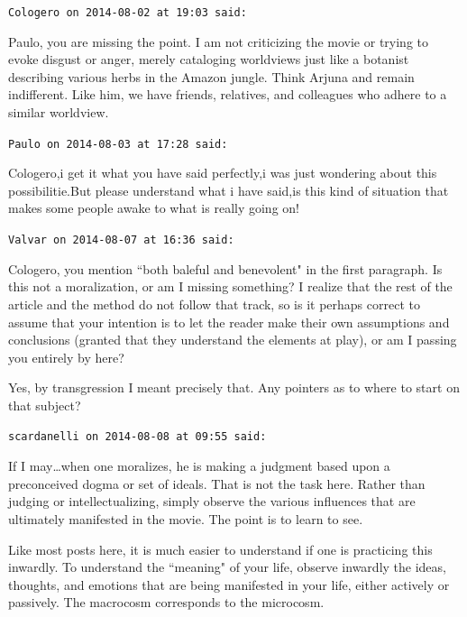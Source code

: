 \begin{footnotesize}
\begin{sffamily}
\hfill

\texttt{Cologero on 2014-08-02 at 19:03 said: }

Paulo, you are missing the point. I am not criticizing the movie or trying to evoke disgust or anger, merely cataloging worldviews just like a botanist describing various herbs in the Amazon jungle. Think Arjuna and remain indifferent. Like him, we have friends, relatives, and colleagues who adhere to a similar worldview.


\hfill

\texttt{Paulo on 2014-08-03 at 17:28 said: }

Cologero,i get it what you have said perfectly,i was just wondering about this possibilitie.But please understand what i have said,is this kind of situation that makes some people awake to what is really going on!


\hfill

\texttt{Valvar on 2014-08-07 at 16:36 said: }

Cologero, you mention ``both baleful and benevolent" in the first paragraph. Is this not a moralization, or am I missing something? I realize that the rest of the article and the method do not follow that track, so is it perhaps correct to assume that your intention is to let the reader make their own assumptions and conclusions (granted that they understand the elements at play), or am I passing you entirely by here?

Yes, by transgression I meant precisely that. Any pointers as to where to start on that subject?


\hfill

\texttt{scardanelli on 2014-08-08 at 09:55 said: }

If I may…when one moralizes, he is making a judgment based upon a preconceived dogma or set of ideals. That is not the task here. Rather than judging or intellectualizing, simply observe the various influences that are ultimately manifested in the movie. The point is to learn to see. 

Like most posts here, it is much easier to understand if one is practicing this inwardly. To understand the ``meaning" of your life, observe inwardly the ideas, thoughts, and emotions that are being manifested in your life, either actively or passively. The macrocosm corresponds to the microcosm.


\end{sffamily}\end{footnotesize}
